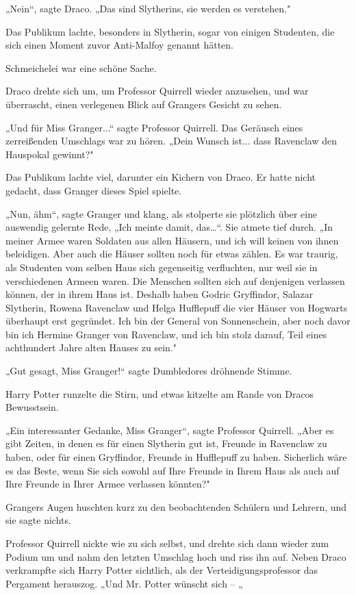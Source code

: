{„Nein“, sagte Draco. „Das sind Slytherins, sie werden es verstehen."

Das Publikum lachte, besonders in Slytherin, sogar von einigen Studenten, die sich einen Moment zuvor Anti-Malfoy genannt hätten.

Schmeichelei war eine schöne Sache.

Draco drehte sich um, um Professor Quirrell wieder anzusehen, und war überrascht, einen verlegenen Blick auf Grangers Gesicht zu sehen.

„Und für Miss Granger...“ sagte Professor Quirrell. Das Geräusch eines zerreißenden Umschlags war zu hören. „Dein Wunsch ist... dass Ravenclaw den Hauspokal gewinnt?"

Das Publikum lachte viel, darunter ein Kichern von Draco. Er hatte nicht gedacht, dass Granger dieses Spiel spielte.

„Nun, ähm“, sagte Granger und klang, als stolperte sie plötzlich über eine auswendig gelernte Rede, „Ich meinte damit, das…“. Sie atmete tief durch. „In meiner Armee waren Soldaten aus allen Häusern, und ich will keinen von ihnen beleidigen. Aber auch die Häuser sollten noch für etwas zählen. Es war traurig, als Studenten vom selben Haus sich gegenseitig verfluchten, nur weil sie in verschiedenen Armeen waren. Die Menschen sollten sich auf denjenigen verlassen können, der in ihrem Haus ist. Deshalb haben Godric Gryffindor, Salazar Slytherin, Rowena Ravenclaw und Helga Hufflepuff die vier Häuser von Hogwarts überhaupt erst gegründet. Ich bin der General von Sonnenschein, aber noch davor bin ich Hermine Granger von Ravenclaw, und ich bin stolz darauf, Teil eines achthundert Jahre alten Hauses zu sein."

„Gut gesagt, Miss Granger!“ sagte Dumbledores dröhnende Stimme.

Harry Potter runzelte die Stirn, und etwas kitzelte am Rande von Dracos Bewusstsein.

„Ein interessanter Gedanke, Miss Granger“, sagte Professor Quirrell. „Aber es gibt Zeiten, in denen es für einen Slytherin gut ist, Freunde in Ravenclaw zu haben, oder für einen Gryffindor, Freunde in Hufflepuff zu haben. Sicherlich wäre es das Beste, wenn Sie sich sowohl auf Ihre Freunde in Ihrem Haus als auch auf Ihre Freunde in Ihrer Armee verlassen könnten?"

Grangers Augen huschten kurz zu den beobachtenden Schülern und Lehrern, und sie sagte nichts.

Professor Quirrell nickte wie zu sich selbst, und drehte sich dann wieder zum Podium um und nahm den letzten Umschlag hoch und riss ihn auf. Neben Draco verkrampfte sich Harry Potter sichtlich, als der Verteidigungsprofessor das Pergament herauszog. „Und Mr. Potter wünscht sich -- „

}
